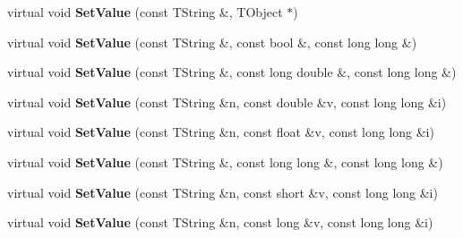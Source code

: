 \begin{DoxyCompactItemize}
\item 
\hypertarget{class_h_a_l_1_1_analysis_data_ac30be252a2ee9afe72db28b4cc2160da}{virtual void {\bfseries Set\+Value} (const T\+String \&, T\+Object $\ast$)}\label{class_h_a_l_1_1_analysis_data_ac30be252a2ee9afe72db28b4cc2160da}

\item 
\hypertarget{class_h_a_l_1_1_analysis_data_a12ad774235747ddc93efe315b22bf9e6}{virtual void {\bfseries Set\+Value} (const T\+String \&, const bool \&, const long long \&)}\label{class_h_a_l_1_1_analysis_data_a12ad774235747ddc93efe315b22bf9e6}

\item 
\hypertarget{class_h_a_l_1_1_analysis_data_a2628f2b892533b16f0a991bee3e0054b}{virtual void {\bfseries Set\+Value} (const T\+String \&, const long double \&, const long long \&)}\label{class_h_a_l_1_1_analysis_data_a2628f2b892533b16f0a991bee3e0054b}

\item 
\hypertarget{class_h_a_l_1_1_analysis_data_a59a7de41ba6832fb70f97b4c1e275fd3}{virtual void {\bfseries Set\+Value} (const T\+String \&n, const double \&v, const long long \&i)}\label{class_h_a_l_1_1_analysis_data_a59a7de41ba6832fb70f97b4c1e275fd3}

\item 
\hypertarget{class_h_a_l_1_1_analysis_data_a69059a19ae4a37a01eedfa98c537c487}{virtual void {\bfseries Set\+Value} (const T\+String \&n, const float \&v, const long long \&i)}\label{class_h_a_l_1_1_analysis_data_a69059a19ae4a37a01eedfa98c537c487}

\item 
\hypertarget{class_h_a_l_1_1_analysis_data_aad5a01dc8b2510bdcb47854a3cdaba0d}{virtual void {\bfseries Set\+Value} (const T\+String \&, const long long \&, const long long \&)}\label{class_h_a_l_1_1_analysis_data_aad5a01dc8b2510bdcb47854a3cdaba0d}

\item 
\hypertarget{class_h_a_l_1_1_analysis_data_adfb861d9e83e6880e54d11447b7047be}{virtual void {\bfseries Set\+Value} (const T\+String \&n, const short \&v, const long long \&i)}\label{class_h_a_l_1_1_analysis_data_adfb861d9e83e6880e54d11447b7047be}

\item 
\hypertarget{class_h_a_l_1_1_analysis_data_ac01b1d8a623777b81d5969d2b553a003}{virtual void {\bfseries Set\+Value} (const T\+String \&n, const long \&v, const long long \&i)}\label{class_h_a_l_1_1_analysis_data_ac01b1d8a623777b81d5969d2b553a003}


\end{DoxyCompactItemize}
